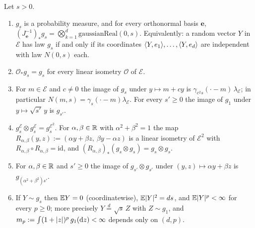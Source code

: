 \begin{auxlemma}\label{c3:gauss}
Let $s>0$.
\begin{enumerate}[label=(\alph*),itemsep=1pt]
\item $g_s$ is a probability measure, and for every orthonormal basis $\mathbf e$, $(J_{\mathbf e}^{-1})_*g_s=\bigotimes_{k=1}^d\mathrm{gaussianReal}(0,s)$. Equivalently: a random vector $Y$ in $\mathcal E$ has law $g_s$ if and only if its coordinates $\langle Y,e_1\rangle,\dots,\langle Y,e_d\rangle$ are independent with law $N(0,s)$ each.
\item $\mathcal O_*g_s=g_s$ for every linear isometry $\mathcal O$ of $\mathcal E$.
\item For $m\in\mathcal E$ and $c\ne0$ the image of $g_s$ under $y\mapsto m+cy$ is $\gamma_{c^2s}(\cdot-m)\,\lambda_{\mathcal E}$; in particular $N(m,s)=\gamma_s(\cdot-m)\lambda_{\mathcal E}$. For every $s'\ge0$ the image of $g_1$ under $y\mapsto\sqrt{s'}\,y$ is $g_{s'}$.
\item $g^{\mathcal E}_s\otimes g^{\mathcal E}_s=g^{\mathcal E^2}_s$. For $\alpha,\beta\in\mathbb{R}$ with $\alpha^2+\beta^2=1$ the map $R_{\alpha,\beta}(y,z):=(\alpha y+\beta z,\ \beta y-\alpha z)$ is a linear isometry of $\mathcal E^2$ with $R_{\alpha,\beta}\circ R_{\alpha,\beta}=\mathrm{id}$, and $(R_{\alpha,\beta})_*(g_s\otimes g_s)=g_s\otimes g_s$.
\item For $\alpha,\beta\in\mathbb{R}$ and $s'\ge0$ the image of $g_{s'}\otimes g_{s'}$ under $(y,z)\mapsto\alpha y+\beta z$ is $g_{(\alpha^2+\beta^2)s'}$.
\item If $Y\sim g_s$ then $\mathbb{E} Y=0$ (coordinatewise), $\mathbb{E}|Y|^2=ds$, and $\mathbb{E}|Y|^p<\infty$ for every $p\ge0$; more precisely $Y\overset{d}=\sqrt s\,Z$ with $Z\sim g_1$, and $m_p:=\int(1+|z|)^p\,g_1(\mathrm{d} z)<\infty$ depends only on $(d,p)$.
\end{enumerate}
\end{auxlemma}

